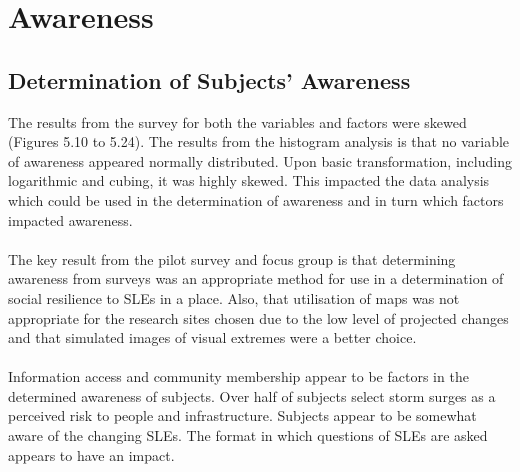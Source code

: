 \section{Awareness}

\subsection{Determination of Subjects' Awareness}
The results from the survey for both the variables and factors were skewed (Figures 5.10 to 5.24). The results from the histogram analysis is that no variable of awareness appeared normally distributed. Upon basic transformation, including logarithmic and cubing, it was highly skewed. This impacted the data analysis which could be used in the determination of awareness and in turn which factors impacted awareness. 

\paragraph{}
The key result from the pilot survey and focus group is that determining awareness from surveys was an appropriate method for use in a determination of social resilience to SLEs in a place. Also, that utilisation of maps was not appropriate for the research sites chosen due to the low level of projected changes and that simulated images of visual extremes were a better choice.
\paragraph{}
Information access and community membership appear to be factors in the determined awareness of subjects. Over half of subjects select storm surges as a perceived risk to people and infrastructure. Subjects appear to be somewhat aware of the changing SLEs. The format in which questions of SLEs are asked appears to have an impact. 


